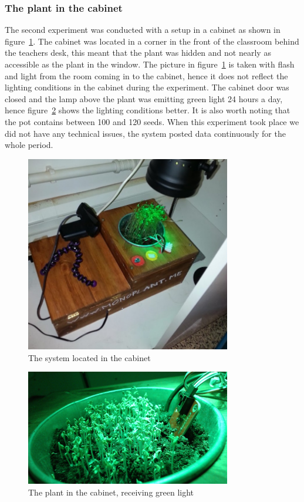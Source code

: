 \subsubsection*{The plant in the cabinet}
The second experiment was conducted with a setup in a cabinet as shown in figure~\ref{fig:cabinetplant}. The cabinet was located in a corner in the front of the classroom behind the teachers desk, this meant that the plant was hidden and not nearly as accessible as the plant in the window. The picture in figure~\ref{fig:cabinetplant} is taken with flash and light from the room coming in to the cabinet, hence it does not reflect the lighting conditions in the cabinet during the experiment. The cabinet door was closed and the lamp above the plant was emitting green light 24 hours a day, hence figure~\ref{fig:cabinetsystemplant} shows the lighting conditions better. It is also worth noting that the pot contains between 100 and 120 seeds. When this experiment took place we did not have any technical issues, the system posted data continuously for the whole period.

\begin{figure}
\centering
\includegraphics[width=0.8\textwidth]{img/empiricalsetting/cupboard.jpg}
\caption{The system located in the cabinet}
\label{fig:cabinetplant}
\end{figure}

\begin{figure}
\centering
\includegraphics[width=0.8\textwidth]{img/empiricalsetting/cupboardsystem.jpg}
\caption{The plant in the cabinet, receiving green light}
\label{fig:cabinetsystemplant}
\end{figure}


